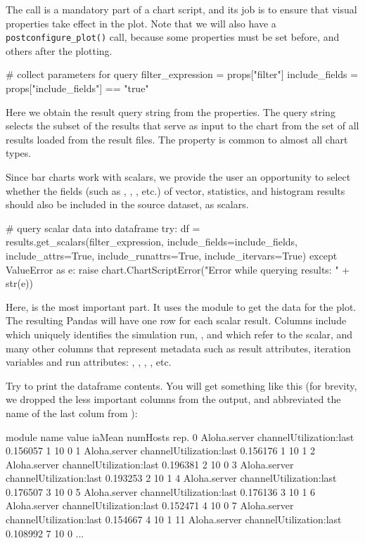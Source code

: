 The  call is a mandatory part of a chart script, and
its job is to ensure that visual properties take effect in the plot. Note that
we will also have a \texttt{postconfigure\_plot()} call, because some properties
must be set before, and others after the plotting.

\begin{python}
# collect parameters for query
filter_expression = props["filter"]
include_fields = props["include_fields"] == "true"
\end{python}

Here we obtain the result query string from the properties. The query string
selects the subset of the results that serve as input to the chart from the set of
all results loaded from the result files. The  property is
common to almost all chart types.

Since bar charts work with scalars, we provide the user an opportunity to select
whether the fields (such as , , , etc.) of vector,
statistics, and histogram results should also be included in the source dataset,
as scalars.

\begin{python}
# query scalar data into dataframe
try:
    df = results.get_scalars(filter_expression, include_fields=include_fields,
             include_attrs=True, include_runattrs=True, include_itervars=True)
except ValueError as e:
    raise chart.ChartScriptError("Error while querying results: " + str(e))
\end{python}

Here,  is the most important part. It uses the
 module to get the data for the plot. The resulting Pandas
 will have one row for each scalar result. Columns include
 which uniquely identifies the simulation run, ,
 and  which refer to the scalar, and many other columns
that represent metadata such as result attributes, iteration variables and run
attributes: , , , , etc.

Try  to print the dataframe contents. You will get something like
this (for brevity, we dropped the less important columns from the output, and
abbreviated the name of the last colum from ):

\begin{commandline}
          module                     name     value iaMean numHosts rep.
0   Aloha.server  channelUtilization:last  0.156057      1       10    0
1   Aloha.server  channelUtilization:last  0.156176      1       10    1
2   Aloha.server  channelUtilization:last  0.196381      2       10    0
3   Aloha.server  channelUtilization:last  0.193253      2       10    1
4   Aloha.server  channelUtilization:last  0.176507      3       10    0
5   Aloha.server  channelUtilization:last  0.176136      3       10    1
6   Aloha.server  channelUtilization:last  0.152471      4       10    0
7   Aloha.server  channelUtilization:last  0.154667      4       10    1
11  Aloha.server  channelUtilization:last  0.108992      7       10    0
...
\end{commandline}

